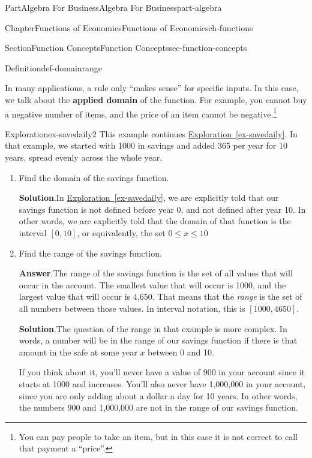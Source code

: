 \documentclass[oneside,10pt,]{tufte-book}
\newcommand{\blocktitlefont}{\relax}
\newcommand{\xreffont}{\relax}
\newcommand{\terminology}[1]{\textbf{#1}}
\numberwithin{equation}{chapter}
\begin{document}
\begin{partptx}{Part}{Algebra For Business}{}{Algebra For Business}{}{}{part-algebra}
\begin{chapterptx}{Chapter}{Functions of Economics}{}{Functions of Economics}{}{}{ch-functions}
\begin{sectionptx}{Section}{Function Concepts}{}{Function Concepts}{}{}{sec-function-concepts}
\begin{definition}{Definition}{}{def-domainrange}
\end{definition}
In many applications, a rule only ``makes sense'' for specific inputs. In this case, we talk about the \terminology{applied domain} of the function. For example, you cannot buy a negative number of items, and the price of an item cannot be negative.\footnote{You can pay people to take an item, but in this case it is not correct to call that payment a ``price''.\label{sec-function-concepts-9-3}}%
\begin{exploration}{Exploration}{}{ex-savedaily2}%
This example continues \hyperref[ex-savedaily]{Exploration~{\xreffont\ref{ex-savedaily}}}. In that example, we started with \textdollar{}1000 in savings and added \textdollar{}365 per year for 10 years, spread evenly across the whole year.%
\begin{enumerate}[font=\bfseries,label=(\alph*),ref=\alph*]%
\item{}Find the domain of the savings function.%
\par\smallskip%
\noindent\textbf{\blocktitlefont Solution}.\hypertarget{ex-savedaily2-2-2}{}\quad{}In \hyperref[ex-savedaily]{Exploration~{\xreffont\ref{ex-savedaily}}}, we are explicitly told that our savings function is not defined before year 0, and not defined after year 10. In other words, we are explicitly told that the domain of that function is the interval \([0,10]\), or equivalently, the set \(0\leq x \leq 10\)%
\item{}Find the range of the savings function.%
\par\smallskip%
\noindent\textbf{\blocktitlefont Answer}.\hypertarget{ex-savedaily2-3-2}{}\quad{}The range of the savings function is the set of all values that will occur in the account. The smallest value that will occur is \textdollar{}1000, and the largest value that will occur is \textdollar{}4,650.  That means that the \emph{range} is the set of all numbers between those values.  In interval notation, this is \([1000,4650]\).%
\par\smallskip%
\noindent\textbf{\blocktitlefont Solution}.\hypertarget{ex-savedaily2-3-3}{}\quad{}The question of the range in that example is more complex. In words, a number will be in the range of our savings function if there is that amount in the safe at some year \(x\) between 0 and 10.%
\par
If you think about it, you'll never have a value of \textdollar{}900 in your account since it starts at \textdollar{}1000 and increases. You'll also never have  \textdollar{}1,000,000 in your account, since you are only adding about a dollar a day for 10 years. In other words, the numbers 900 and \textdollar{}1,000,000 are not in the range of our savings function.%

\end{enumerate}
\end{exploration}
\end{sectionptx}
\end{chapterptx}
\end{partptx}
\end{document}
